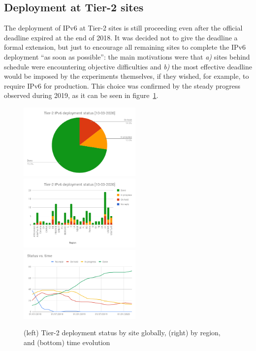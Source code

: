 \subsection{Deployment at Tier-2 sites}
The deployment of IPv6 at Tier-2 sites is still proceeding even after the
official deadline expired at the end of 2018. It was decided not to
give the deadline a formal extension, but just to encourage all
remaining sites to complete the IPv6 deployment ``as soon as
possible'': the main motivations were that \emph{a)} sites behind
schedule were encountering objective difficulties and \emph{b)} the
most effective deadline would be imposed by the experiments
themselves, if they wished, for example, to require IPv6 for
production. This choice was confirmed by the steady progress observed
during 2019, as it can be seen in figure~\ref{fig:t2depl}.
\begin{figure}[h]
\centering
\includegraphics[width=6cm]{chart2}
\includegraphics[width=6cm]{chart}
\includegraphics[width=6cm]{chart3}
\caption{(left) Tier-2 deployment status by site globally, (right) by region, and (bottom) time evolution}
\label{fig:t2depl}
\end{figure}

